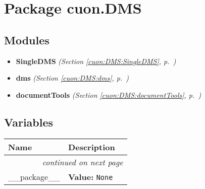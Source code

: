 %
%
%


\section{Package cuon.DMS}

    \label{cuon:DMS}


\subsection{Modules}

\begin{itemize}
\setlength{\parskip}{0ex}
\item \textbf{SingleDMS}
  \textit{(Section \ref{cuon:DMS:SingleDMS}, p.~\pageref{cuon:DMS:SingleDMS})}

\item \textbf{dms}
  \textit{(Section \ref{cuon:DMS:dms}, p.~\pageref{cuon:DMS:dms})}

\item \textbf{documentTools}
  \textit{(Section \ref{cuon:DMS:documentTools}, p.~\pageref{cuon:DMS:documentTools})}

\end{itemize}



  \subsection{Variables}

    \vspace{-1cm}
\hspace{\varindent}\begin{longtable}{|p{\varnamewidth}|p{\vardescrwidth}|l}
\cline{1-2}
\cline{1-2} \centering \textbf{Name} & \centering \textbf{Description}& \\
\cline{1-2}
\endhead\cline{1-2}\multicolumn{3}{r}{\small\textit{continued on next page}}\\\endfoot\cline{1-2}
\endlastfoot\raggedright \_\-\_\-p\-a\-c\-k\-a\-g\-e\-\_\-\_\- & \raggedright \textbf{Value:} 
{\tt None}&\\
\cline{1-2}
\end{longtable}

